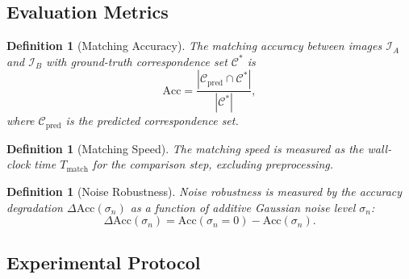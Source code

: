 \documentclass[11pt,twocolumn,a4paper]{article}
\newtheorem{definition}[theorem]{Definition}
\begin{document}
\subsection{Evaluation Metrics}

\begin{definition}[Matching Accuracy]\label{def:accuracy}
The matching accuracy between images $\mathcal{I}_A$ and $\mathcal{I}_B$ with ground-truth correspondence set $\mathcal{C}^*$ is
\begin{equation}
    \text{Acc} = \frac{|\mathcal{C}_{\text{pred}} \cap \mathcal{C}^*|}{|\mathcal{C}^*|},
    \label{eq:accuracy}
\end{equation}
where $\mathcal{C}_{\text{pred}}$ is the predicted correspondence set.
\end{definition}

\begin{definition}[Matching Speed]\label{def:speed}
The matching speed is measured as the wall-clock time $T_{\text{match}}$ for the comparison step, excluding preprocessing.
\end{definition}

\begin{definition}[Noise Robustness]\label{def:robustness}
Noise robustness is measured by the accuracy degradation $\Delta\text{Acc}(\sigma_n)$ as a function of additive Gaussian noise level $\sigma_n$:
\begin{equation}
    \Delta\text{Acc}(\sigma_n) = \text{Acc}(\sigma_n = 0) - \text{Acc}(\sigma_n).
    \label{eq:robustness}
\end{equation}
\end{definition}

\subsection{Experimental Protocol}
\end{document}
